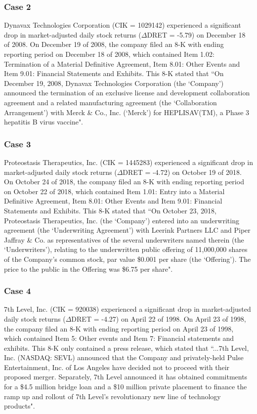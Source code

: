 \subsubsection*{Case 2}
Dynavax Technologies Corporation (CIK = 1029142) experienced a significant drop in market-adjusted daily stock returns ($\Delta$DRET = -5.79) on December 18 of 2008. On December 19 of 2008, the company filed an 8-K with ending reporting period on December 18 of 2008, which contained Item 1.02: Termination of a Material Definitive Agreement, Item 8.01: Other Events and Item 9.01: Financial Statements and Exhibits. This 8-K stated that ``On December 19, 2008, Dynavax Technologies Corporation (the `Company') announced the termination of an exclusive license and development collaboration agreement and a related manufacturing agreement (the `Collaboration Arrangement') with Merck \& Co., Inc. (`Merck') for HEPLISAV(TM), a Phase 3 hepatitis B virus vaccine". 
\subsubsection*{Case 3}
Proteostasis Therapeutics, Inc. (CIK = 1445283) experienced a significant drop in market-adjusted daily stock returns ($\Delta$DRET = -4.72) on October 19 of 2018. On October 24 of 2018, the company filed an 8-K with ending reporting period on October 22 of 2018, which contained Item 1.01: Entry into a Material Definitive Agreement, Item 8.01: Other Events and Item 9.01: Financial Statements and Exhibits. This 8-K stated that ``On October 23, 2018, Proteostasis Therapeutics, Inc. (the `Company') entered into an underwriting agreement (the `Underwriting Agreement') with Leerink Partners LLC and Piper Jaffray \& Co. as representatives of the several underwriters named therein (the `Underwriters'), relating to the underwritten public offering of 11,000,000 shares of the Company’s common stock, par value \$0.001 per share (the `Offering'). The price to the public in the Offering was \$6.75 per share". 
\subsubsection*{Case 4}
7th Level, Inc. (CIK = 920038) experienced a significant drop in market-adjusted daily stock returns ($\Delta$DRET = -4.27) on April 22 of 1998. On April 23 of 1998, the company filed an 8-K with ending reporting period on April 23 of 1998, which contained Item 5: Other events and Item 7: Financial statements and exhibits. This 8-K only contained a press release, which stated that ``...7th Level, Inc. (NASDAQ: SEVL) announced that the Company and privately-held Pulse Entertainment, Inc. of Los Angeles have decided not to proceed with their proposed merger.  Separately, 7th Level announced it has obtained commitments for a \$4.5 million bridge loan and a \$10 million private placement to finance the ramp up and rollout of 7th Level's revolutionary new line of technology products".
